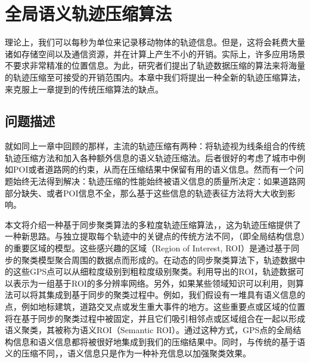 
\chapter{全局语义轨迹压缩算法}
\label{chapter:main1}

理论上，我们可以每秒为单位来记录移动物体的轨迹信息。但是，这将会耗费大量诸如存储空间以及通信资源，并在计算上产生不小的开销。实际上，许多应用场景不要求非常精准的位置信息。为此，研究者们提出了轨迹数据压缩的算法来将海量的轨迹压缩至可接受的开销范围内。本章中我们将提出一种全新的轨迹压缩算法，来克服上一章提到的传统压缩算法的缺点。


\section{问题描述}
\label{sec:start}
就如同上一章中回顾的那样，主流的轨迹压缩有两种：将轨迹视为线条组合的传统轨迹压缩方法和加入各种额外信息的语义轨迹压缩法。后者很好的考虑了城市中例如POI或者道路网的约束，从而在压缩结果中保留有用的语义信息。然而有一个问题始终无法得到解决：轨迹压缩的性能始终被语义信息的质量所决定：如果道路网部分缺失、或者POI信息不全，那么基于这些信息的轨迹表征方法将大大收到影响。

本文将介绍一种基于同步聚类算法的多粒度轨迹压缩算法，\CascadeSync，这为轨迹压缩提供了一种新思路。与独立提取每个轨迹中的关键点的传统方法不同，（即全局结构信息）的重要区域的模型。这些感兴趣的区域（Region of Interest, ROI）是通过基于同步的聚类模型聚合周围的数据点而形成的。在动态的同步聚类算法下，轨迹数据中的这些GPS点可以从细粒度级别到粗粒度级别聚类。利用导出的ROI，轨迹数据可以表示为一组基于ROI的多分辨率网络。另外，如果某些领域知识可以利用，则算法可以将其集成到基于同步的聚类过程中。例如，我们假设有一堆具有语义信息的点，例如地标建筑，道路交叉点或发生重大事件的地方。这些重要点或区域的位置将在基于同步的聚类过程中被固定，并且它们吸引相邻点或区域组合在一起以形成语义聚类，其被称为语义ROI（Semantic ROI）。通过这种方式，GPS点的全局结构信息和语义信息都将被很好地集成到我们的压缩结果中。同时，与传统的基于语义的压缩不同，，语义信息只是作为一种补充信息以加强聚类效果。


